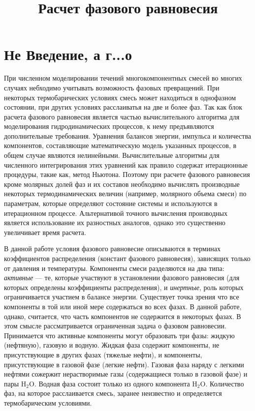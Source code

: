 \documentclass[12pt]{article}
\title{Расчет фазового равновесия}
\begin{document}
\maketitle

\section{Не Введение, а г...о}

При численном моделировании течений многокомпонентных смесей во многих случаях небходимо учитывать возможность фазовых превращений. При некоторых термобарических условиях смесь может находиться в однофазном состоянии, при других условиях расслаиватья на две и более фаз. Так как блок расчета фазового равновесия является частью вычислительного алгоритма для моделирования гидродинамических процессов, к нему предъявляются дополнительные требования. Уравнения балансов энергии, импульса и количества компонентов, составляющие математическую модель указанных процессов, в общем случае являются нелинейными. Вычислительные алгоритмы для численного интегрирования этих уравнений как правило содержат итерационные процедуры, такие как, метод Ньютона. Поэтому при расчете фазового равновесия кроме молярных долей фаз и их составов необходимо вычислять производные некоторых термодинамических величин (например, молярного объема смеси) по параметрам, которые определяют состояние системы и используются в итерационном процессе. Альтернативой точного вычисления производных является использование их разностных аналогов, однако это существенно увеличивает время расчета.

В данной работе условия фазового равновесие описываются в терминах коэффициентов распределения (констант фазового равновесия), зависящих только от давления и температуры. Компоненты смеси разделяются на два типа: \emph{активные} --- те, которые участвуют в установлении фазового равновесия (для которых определены коэффициенты распределения), и \emph{инертные}, роль которых ограничивается участием в балансе энергии. Существует точка зрения что все компоненты в той или иной мере содержаться во всех фазах. В данной работе, однако, считается, что часть компонентов не содержится в некоторых фазах. В этом смысле рассматривается ограниченная задача о фазовом равновесии. Принимается что активные компоненты могут образовать три фазы: жидкую (нефтяную), газовую и водную.  Жидкая фаза содержит компоненты, не присутствующие в других фазах (тяжелые нефти), и компоненты, присутствующие в газовой фазе (легкие нефти). Газовая фаза наряду с легкими нефтями сожержит нерастворимые газы (содержащиеся только в газовой фазе) и пары $\mathrm{H_2O}$. Водная фаза состоит только из одного компонента $\mathrm{H_2O}$. Количество фаз, на которое расслаивается смесь, заранее неизвестно и определяется термобарическим условиями.
\end{document}
